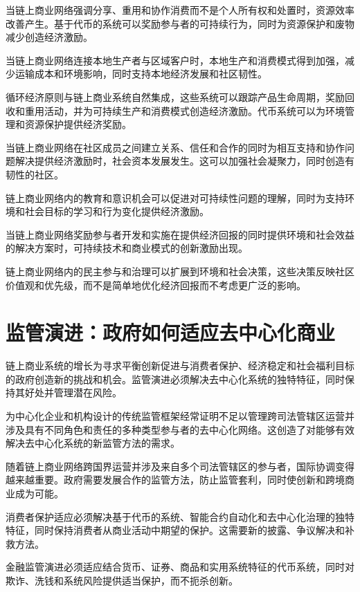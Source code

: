 \documentclass[
  Letterpaper,
]{scrbook}
\begin{document}
当链上商业网络强调分享、重用和协作消费而不是个人所有权和处置时，资源效率改善产生。基于代币的系统可以奖励参与者的可持续行为，同时为资源保护和废物减少创造经济激励。

当链上商业网络连接本地生产者与区域客户时，本地生产和消费模式得到加强，减少运输成本和环境影响，同时支持本地经济发展和社区韧性。

循环经济原则与链上商业系统自然集成，这些系统可以跟踪产品生命周期，奖励回收和重用活动，并为可持续生产和消费模式创造经济激励。代币系统可以为环境管理和资源保护提供经济奖励。

当链上商业网络在社区成员之间建立关系、信任和合作的同时为相互支持和协作问题解决提供经济激励时，社会资本发展发生。这可以加强社会凝聚力，同时创造有韧性的社区。

链上商业网络内的教育和意识机会可以促进对可持续性问题的理解，同时为支持环境和社会目标的学习和行为变化提供经济激励。

当链上商业网络奖励参与者开发和实施在提供经济回报的同时提供环境和社会效益的解决方案时，可持续技术和商业模式的创新激励出现。

链上商业网络内的民主参与和治理可以扩展到环境和社会决策，这些决策反映社区价值观和优先级，而不是简单地优化经济回报而不考虑更广泛的影响。

\section{监管演进：政府如何适应去中心化商业}\label{ux76d1ux7ba1ux6f14ux8fdbux653fux5e9cux5982ux4f55ux9002ux5e94ux53bbux4e2dux5fc3ux5316ux5546ux4e1a}

链上商业系统的增长为寻求平衡创新促进与消费者保护、经济稳定和社会福利目标的政府创造新的挑战和机会。监管演进必须解决去中心化系统的独特特征，同时保持其好处并管理潜在风险。

为中心化企业和机构设计的传统监管框架经常证明不足以管理跨司法管辖区运营并涉及具有不同角色和责任的多种类型参与者的去中心化网络。这创造了对能够有效解决去中心化系统的新监管方法的需求。

随着链上商业网络跨国界运营并涉及来自多个司法管辖区的参与者，国际协调变得越来越重要。政府需要发展合作的监管方法，防止监管套利，同时使创新和跨境商业成为可能。

消费者保护适应必须解决基于代币的系统、智能合约自动化和去中心化治理的独特特征，同时保持消费者从商业活动中期望的保护。这需要新的披露、争议解决和补救方法。

金融监管演进必须适应结合货币、证券、商品和实用系统特征的代币系统，同时对欺诈、洗钱和系统风险提供适当保护，而不扼杀创新。
\end{document}
